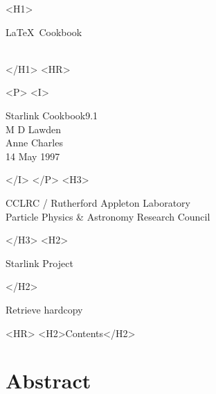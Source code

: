 \documentclass[twoside,11pt]{article}
\newcommand{\stardoccategory}  {Starlink Cookbook}
\newcommand{\stardocsource}    {sc\stardocnumber}
\newcommand{\stardocnumber}    {9.1}
\newcommand{\stardocauthors}   {M D Lawden\\
                                Anne Charles}
\newcommand{\stardocdate}      {14 May 1997}
\newcommand{\stardoctitle}     {\LaTeX\ Cookbook}
\newcommand{\htmladdnormallink}[2]{#1}
\newcommand{\htmladdimg}[1]{}
\newcommand{\htmlref}[2]{#1}
\newcommand{\htmladdtonavigation}[1]{}
\newcommand{\xlabel}[1]{}
\renewcommand{\_}{\texttt{\symbol{95}}}
\begin{document}
\begin{htmlonly}
   \xlabel{}
   \begin{rawhtml} <H1> \end{rawhtml}
      \stardoctitle\\
      \stardocversion\\
      \stardocmanual
   \begin{rawhtml} </H1> <HR> \end{rawhtml}


   \begin{rawhtml} <P> <I> \end{rawhtml}
   \stardoccategory \stardocnumber \\
   \stardocauthors \\
   \stardocdate
   \begin{rawhtml} </I> </P> <H3> \end{rawhtml}
      \htmladdnormallink{CCLRC / Rutherford Appleton Laboratory}
                        {http://www.cclrc.ac.uk} \\
      \htmladdnormallink{Particle Physics \& Astronomy Research Council}
                        {http://www.pparc.ac.uk} \\
   \begin{rawhtml} </H3> <H2> \end{rawhtml}
      \htmladdnormallink{Starlink Project}{http://www.starlink.rl.ac.uk/}
   \begin{rawhtml} </H2> \end{rawhtml}
   \htmladdnormallink{\htmladdimg{source.gif} Retrieve hardcopy}
      {http://www.starlink.rl.ac.uk/cgi-bin/hcserver?\stardocsource}\\

  \label{stardoccontents}
  \begin{rawhtml} 
    <HR>
    <H2>Contents</H2>
  \end{rawhtml}
  \htmladdtonavigation{\htmlref{\htmladdimg{contents_motif.gif}}
        {stardoccontents}}

  \section{\xlabel{abstract}Abstract}

\end{htmlonly}
\end{document}

